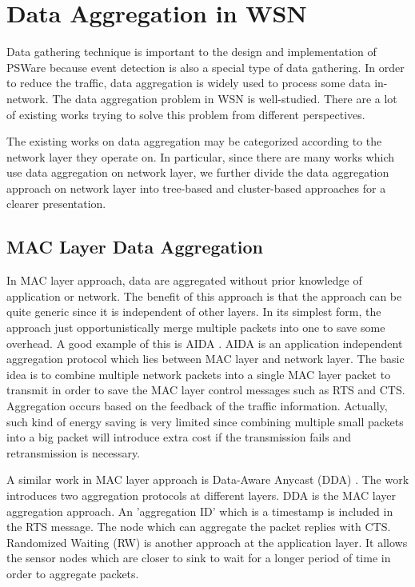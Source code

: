\section{Data Aggregation in WSN}
Data gathering technique is important to the design and implementation of PSWare because event detection is also a special type of data gathering. In order to reduce the traffic, data aggregation is widely used to process some data in-network. The data aggregation problem in WSN is well-studied. There are a lot of existing works trying to solve this problem from different perspectives.

The existing works on data aggregation may be categorized according to the network layer they operate on. In particular, since there are many works which use data aggregation on network layer, we further divide the data aggregation approach on network layer into tree-based and cluster-based approaches for a clearer presentation.

\subsection{MAC Layer Data Aggregation}
In MAC layer approach, data are aggregated without prior knowledge of application or network. The benefit of this approach is that the approach can be quite generic since it is independent of other layers. In its simplest form, the approach just opportunistically merge multiple packets into one to save some overhead. A good example of this is AIDA \cite{aida}. AIDA is an application independent aggregation protocol which lies between MAC layer and network layer. The basic idea is to combine multiple network packets into a single MAC layer packet to transmit in order to save the MAC layer control messages such as RTS and CTS. Aggregation occurs based on the feedback of the traffic information. Actually, such kind of energy saving is very limited since combining multiple small packets into a big packet will introduce extra cost if the transmission fails and retransmission is necessary.

A similar work in MAC layer approach is Data-Aware Anycast (DDA) \cite{daa}. The work introduces two aggregation protocols at different layers. DDA is the MAC layer aggregation approach. An 'aggregation ID' which is a timestamp is included in the RTS message. The node which can aggregate the packet replies with CTS. Randomized Waiting (RW) is another approach at the application layer. It allows the sensor nodes which are closer to sink to wait for a longer period of time in order to aggregate packets.

